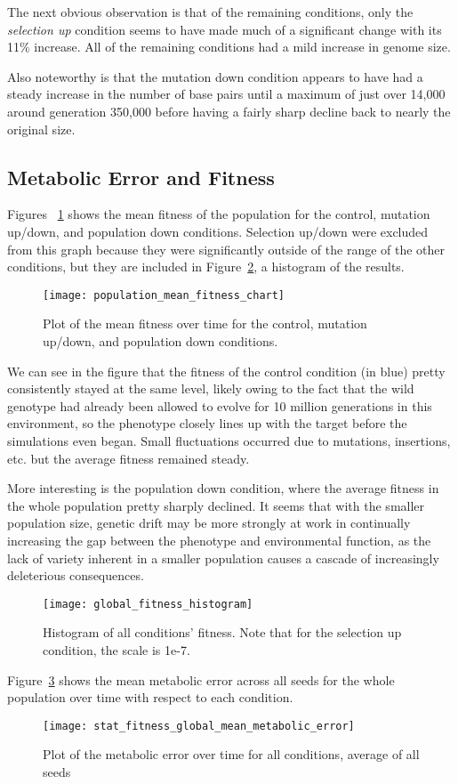 The next obvious observation is that of the remaining conditions, only the \textit{selection up} condition seems to have made much of a significant change with its 11\% increase. All of the remaining conditions had a mild increase in genome size. 

Also noteworthy is that the mutation down condition appears to have had a steady increase in the number of base pairs until a maximum of just over 14,000 around generation 350,000 before having a fairly sharp decline back to nearly the original size. 

\subsection{Metabolic Error and Fitness}
Figures ~\ref{fig:mean_fitness_plot} shows the mean fitness of the population for the control, mutation up/down, and population down conditions. Selection up/down were excluded from this graph because they were significantly outside of the range of the other conditions, but they are included in Figure~\ref{fig:global_fitness_histogram}, a histogram of the results.

\begin{figure}[H]
	\texttt{[image: population\_mean\_fitness\_chart]}
	\caption[Mean fitness]{Plot of the mean fitness over time for the control, mutation up/down, and population down conditions.}
	\label{fig:mean_fitness_plot}
\end{figure}

We can see in the figure that the fitness of the control condition (in blue) pretty consistently stayed at the same level, likely owing to the fact that the wild genotype had already been allowed to evolve for 10 million generations in this environment, so the phenotype closely lines up with the target before the simulations even began. Small fluctuations occurred due to mutations, insertions, etc. but the average fitness remained steady. 

More interesting is the population down condition, where the average fitness in the whole population pretty sharply declined. It seems that with the smaller population size, genetic drift may be more strongly at work in continually increasing the gap between the phenotype and environmental function, as the lack of variety inherent in a smaller population causes a cascade of increasingly deleterious consequences. 

\begin{figure}[H]
	\texttt{[image: global\_fitness\_histogram]}
	\caption[Mean fitness histogram]{Histogram of all conditions' fitness. Note that for the selection up condition, the scale is 1e-7. }
	\label{fig:global_fitness_histogram}
\end{figure}
Figure~\ref{fig:mean_metabolic_error} shows the mean metabolic error across all seeds for the whole population over time with respect to each condition. 
\begin{figure}[H]
	\texttt{[image: stat\_fitness\_global\_mean\_metabolic\_error]}
	\caption[Metabolic error]{Plot of the metabolic error over time for all conditions, average of all seeds}
	\label{fig:mean_metabolic_error}
\end{figure}


